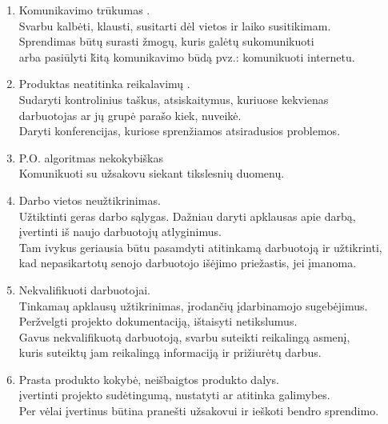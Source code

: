 \documentclass[a4paper,12pt]{article}
\begin{document}
\begin{enumerate}

	\item Komunikavimo tr\= ukumas . \\
  		Svarbu kalb\. eti, klausti, susitarti d\. el vietos ir laiko susitikimam.\\
  		Sprendimas  b\= utų surasti \v zmog\k u, kuris gal\. etų sukomunikuoti \\
  		arba pasi\= ulyti \v kitą komunikavimo b\= udą pvz.: komunikuoti internetu. 
  		
  	\item Produktas neatitinka reikalavim\k u . \\
  		Sudaryti kontrolinius ta\v skus, atsiskaitymus, kuriuose kekvienas \\ 
  		darbuotojas ar j\k u grup\. e parašo kiek, nuveik\. e.\\
  		Daryti konferencijas, kuriose spren\v ziamos atsiradusios problemos.
  		
  	\item P.O. algoritmas nekokybiškas \\
  	Komunikuoti su užsakovu siekant tikslesnių duomenų.
  	
	\item Darbo vietos neu\v ztikrinimas.\\
  		U\v ztiktinti geras darbo sąlygas. Dažniau daryti apklausas apie darb\k a,\\ 
  		\k ivertinti iš naujo darbuotoj\k u atlyginimus.\\
  		Tam ivykus geriausia b\= utu pasamdyti atitinkam\k a darbuotoj\k a ir u\v ztikrinti,\\
  		kad nepasikartot\k u senojo darbuotojo i\v s\. ejimo prie\v zastis, jei \k imanoma.
  		
	\item Nekvalifikuoti darbuotojai. \\
  		Tinkama\k u apklaus\k u u\v ztikrinimas, įrodan\v ci\k u \k idarbinamojo sugeb\. ejimus. \\ Per\v zvelgti projekto dokumentaciją, i\v staisyti netikslumus.\\
  		Gavus nekvalifikuot\k a darbuotoj\k a, svarbu suteikti reikaling\k a asmen\k i, \\
  		kuris suteiktų jam reikalingą informaciją ir pri\v ziur\. etų darbus.

	\item Prasta produkto kokybė, nei\v sbaigtos produkto dalys.\\
		\k ivertinti projekto sud\. etingum\k a, nustatyti ar atitinka galimybes.\\
		Per v\. elai  \k ivertinus b\= utina prane\v sti u\v zsakovui ir ie\v skoti bendro 				sprendimo.
  		

\end{enumerate}
\end{document}
